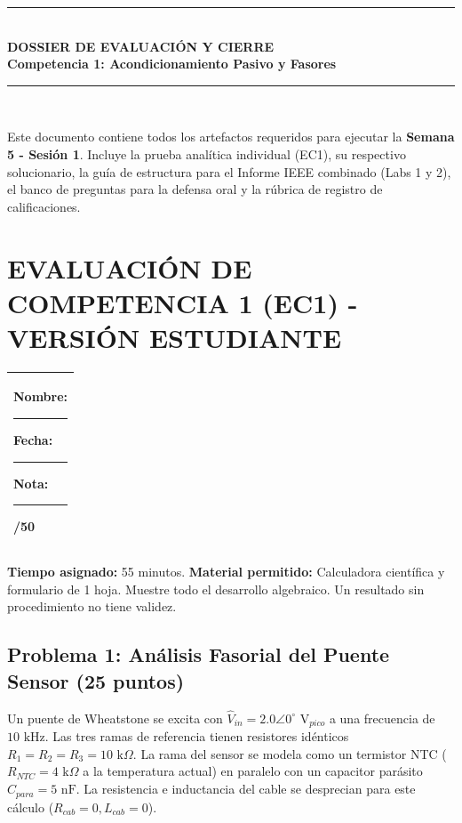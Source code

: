 \documentclass[11pt,a4paper,twoside]{article}
\begin{document}
\begin{center}
    \rule{\textwidth}{1.5pt}\\[0.4cm]
    {\huge \textbf{DOSSIER DE EVALUACIÓN Y CIERRE}}\\[0.2cm]
    {\LARGE \textbf{Competencia 1: Acondicionamiento Pasivo y Fasores}}\\[0.3cm]
    \rule{\textwidth}{1.5pt}\\[0.5cm]
\end{center}

\begin{docente}
Este documento contiene todos los artefactos requeridos para ejecutar la \textbf{Semana 5 - Sesión 1}. Incluye la prueba analítica individual (EC1), su respectivo solucionario, la guía de estructura para el Informe IEEE combinado (Labs 1 y 2), el banco de preguntas para la defensa oral y la rúbrica de registro de calificaciones.
\end{docente}

\newpage
\section{EVALUACIÓN DE COMPETENCIA 1 (EC1) - VERSIÓN ESTUDIANTE}
\begin{table}[h!]
    \centering
    \begin{tabularx}{\textwidth}{|X|}
        \hline
        \textbf{Nombre:} \rule{8cm}{0.4pt} \quad \textbf{Fecha:} \rule{3cm}{0.4pt} \quad \textbf{Nota:} \rule{1.5cm}{0.4pt}/50 \\
        \hline
    \end{tabularx}
\end{table}

\begin{info}
\textbf{Tiempo asignado:} 55 minutos. \textbf{Material permitido:} Calculadora científica y formulario de 1 hoja. Muestre todo el desarrollo algebraico. Un resultado sin procedimiento no tiene validez.
\end{info}

\subsection*{Problema 1: Análisis Fasorial del Puente Sensor (25 puntos)}
Un puente de Wheatstone se excita con $\hat{V}_{in} = 2.0\angle 0^\circ\text{ V}_{pico}$ a una frecuencia de $10\text{ kHz}$. Las tres ramas de referencia tienen resistores idénticos $R_1=R_2=R_3=10\text{ k}\Omega$. La rama del sensor se modela como un termistor NTC ($R_{NTC} = 4\text{ k}\Omega$ a la temperatura actual) en paralelo con un capacitor parásito $C_{para} = 5\text{ nF}$. La resistencia e inductancia del cable se desprecian para este cálculo ($R_{cab}=0, L_{cab}=0$).
\end{document}
